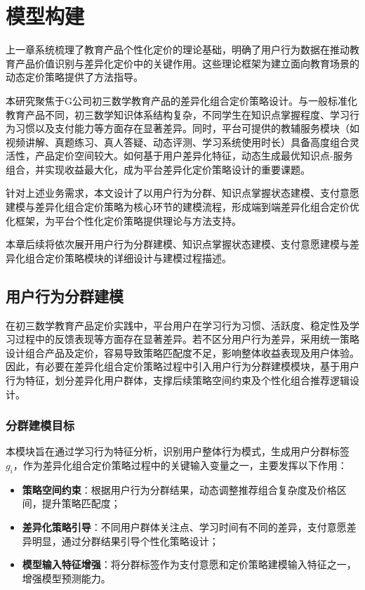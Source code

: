 \chapter{模型构建}
\label{chapter:模型构建}

上一章系统梳理了教育产品个性化定价的理论基础，明确了用户行为数据在推动教育产品价值识别与差异化定价中的关键作用。这些理论框架为建立面向教育场景的动态定价策略提供了方法指导。

本研究聚焦于G公司初三数学教育产品的差异化组合定价策略设计。与一般标准化教育产品不同，初三数学知识体系结构复杂，不同学生在知识点掌握程度、学习行为习惯以及支付能力等方面存在显著差异。同时，平台可提供的教辅服务模块（如视频讲解、真题练习、真人答疑、动态评测、学习系统使用时长）具备高度组合灵活性，产品定价空间较大。如何基于用户差异化特征，动态生成最优知识点-服务组合，并实现收益最大化，成为平台差异化定价策略设计的重要课题。

针对上述业务需求，本文设计了以用户行为分群、知识点掌握状态建模、支付意愿建模与差异化组合定价策略为核心环节的建模流程，形成端到端差异化组合定价优化框架，为平台个性化定价策略提供理论与方法支持。

本章后续将依次展开用户行为分群建模、知识点掌握状态建模、支付意愿建模与差异化组合定价策略模块的详细设计与建模过程描述。
\section{用户行为分群建模}
\label{sec:用户行为分群建模}

在初三数学教育产品定价实践中，平台用户在学习行为习惯、活跃度、稳定性及学习过程中的反馈表现等方面存在显著差异。若不区分用户行为差异，采用统一策略设计组合产品及定价，容易导致策略匹配度不足，影响整体收益表现及用户体验。因此，有必要在差异化组合定价策略过程中引入用户行为分群建模模块，基于用户行为特征，划分差异化用户群体，支撑后续策略空间约束及个性化组合推荐逻辑设计。

\subsection{分群建模目标}

本模块旨在通过学习行为特征分析，识别用户整体行为模式，生成用户分群标签 $g_i$，作为差异化组合定价策略过程中的关键输入变量之一，主要发挥以下作用：

\begin{itemize}
\item \textbf{策略空间约束}：根据用户行为分群结果，动态调整推荐组合复杂度及价格区间，提升策略匹配度；
\item \textbf{差异化策略引导}：不同用户群体关注点、学习时间有不同的差异，支付意愿差异明显，通过分群结果引导个性化策略设计；
\item \textbf{模型输入特征增强}：将分群标签作为支付意愿和定价策略建模输入特征之一，增强模型预测能力。
\end{itemize}

